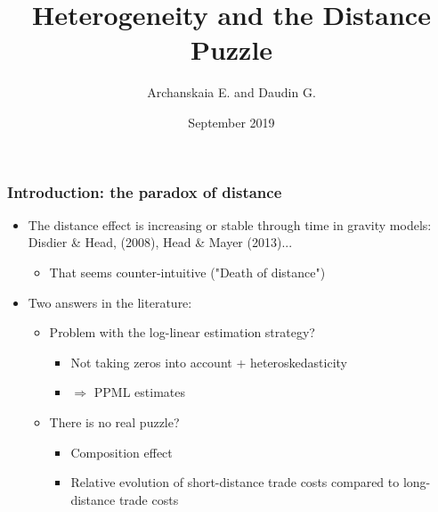\documentclass{beamer}
\newcommand{\noteLA}[1]{\textcolor{blue}{\footnotesize\textit{{noteLA: #1}}}} %
\def\noteLA #1{} %
\begin{document}
\title{Heterogeneity and the Distance Puzzle}  
\author[Archanskaia and Daudin]{Archanskaia E.\inst{*} and Daudin G.\inst{**}}
\date{September 2019
\\
\vspace{.3cm}
} 
\begin{frame}[plain]
\titlepage
\end{frame}

\begin{frame}[plain]\frametitle{Introduction: the paradox of distance}
\begin{itemize}
	\item The distance effect is increasing or stable through time in gravity models: Disdier  \&  Head, (2008), Head \& Mayer (2013)...
	\begin{itemize}
		\item That seems counter-intuitive ("Death of distance")
	\end{itemize}
	\item Two answers in the literature:
	\begin{itemize}
		\item Problem with the log-linear estimation strategy?
		\begin{itemize}
			\item Not taking zeros into account + heteroskedasticity 
			\item $\Rightarrow$ PPML estimates
		\end{itemize}
	\item There is no real puzzle?
	\begin{itemize}
		\item Composition effect
		\item Relative evolution of short-distance trade costs compared to long-distance trade costs
		\noteLA{Contribute to but do not remove it}
	\end{itemize}
\end{itemize}
\noteLA{Say here: world may be getting smaller while at the same time the elasticity of trade to distance may be non-decreasing. This is where ambiguity in distance puzzle appears.}

\end{itemize}
\end{frame}
\end{document}
